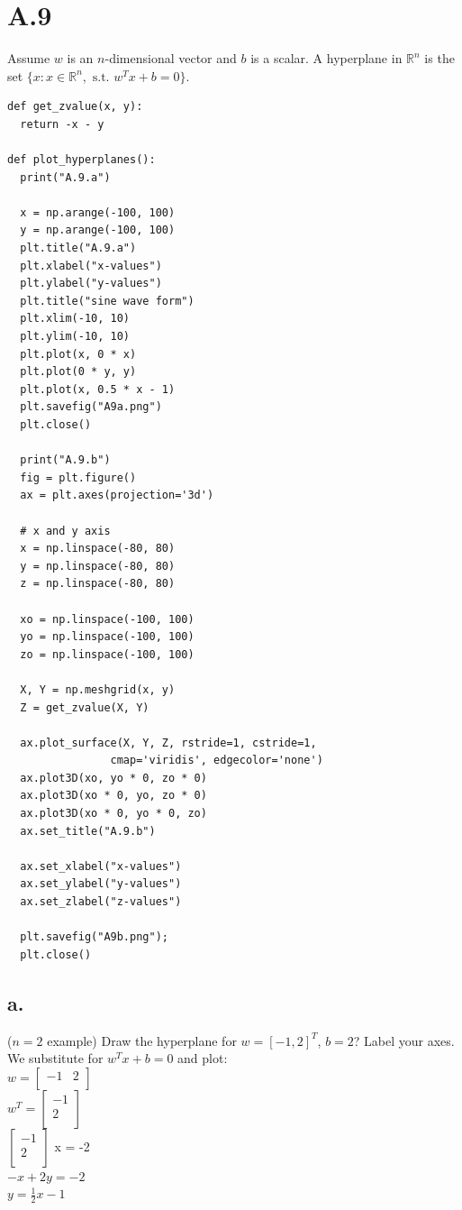 \documentclass{article}
\newcommand{\field}[1]{\mathbb{#1}}
\newcommand{\1}{\mathbf{1}}
\newcommand{\R}{\field{R}} %
\begin{document}
\section*{A.9}
{\Large 

Assume $w$ is an $n$-dimensional vector and $b$ is a scalar. A hyperplane in $\R^n$ is the set $\{x : x\in \R^n,\text{ s.t. } w^T x + b = 0\}$.

\begin{verbatim}
def get_zvalue(x, y):
  return -x - y

def plot_hyperplanes():
  print("A.9.a")

  x = np.arange(-100, 100)
  y = np.arange(-100, 100)
  plt.title("A.9.a")
  plt.xlabel("x-values")
  plt.ylabel("y-values")
  plt.title("sine wave form")
  plt.xlim(-10, 10)
  plt.ylim(-10, 10)
  plt.plot(x, 0 * x)
  plt.plot(0 * y, y)
  plt.plot(x, 0.5 * x - 1)
  plt.savefig("A9a.png")
  plt.close()

  print("A.9.b")
  fig = plt.figure()
  ax = plt.axes(projection='3d')

  # x and y axis
  x = np.linspace(-80, 80)
  y = np.linspace(-80, 80)
  z = np.linspace(-80, 80)

  xo = np.linspace(-100, 100)
  yo = np.linspace(-100, 100)
  zo = np.linspace(-100, 100)
  
  X, Y = np.meshgrid(x, y)
  Z = get_zvalue(X, Y)
  
  ax.plot_surface(X, Y, Z, rstride=1, cstride=1,
                cmap='viridis', edgecolor='none')
  ax.plot3D(xo, yo * 0, zo * 0)
  ax.plot3D(xo * 0, yo, zo * 0)
  ax.plot3D(xo * 0, yo * 0, zo)
  ax.set_title("A.9.b")
  
  ax.set_xlabel("x-values")
  ax.set_ylabel("y-values")
  ax.set_zlabel("z-values")
  
  plt.savefig("A9b.png");
  plt.close()
\end{verbatim}

\subsection*{a.}
($n=2$ example) Draw the hyperplane for $w=[-1,2]^T$, $b=2$? Label your axes. \\ 
We substitute for $w^T x + b = 0$ and plot: \\
$w = \begin{bmatrix} -1 & 2 \\ \end{bmatrix}$ \\
$w^T = \begin{bmatrix} -1 \\ 2 \\ \end{bmatrix}$ \\
$\begin{bmatrix} -1 \\ 2 \\ \end{bmatrix}$ x = -2 \\
$-x + 2y = -2$ \\
$y = \frac{1}{2}x -1$ \\

}
\end{document}
